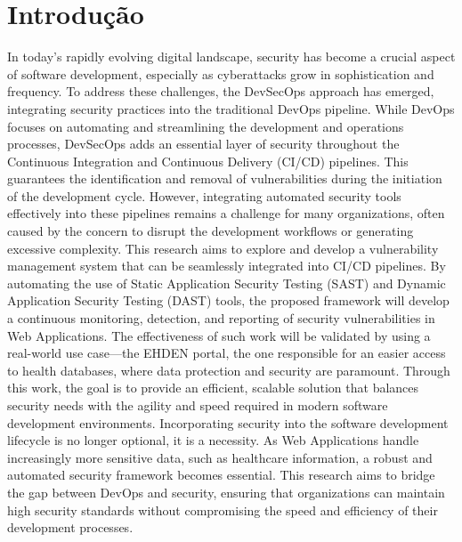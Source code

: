 \chapter{Introdução}%
\label{chapter:introduction}


\begin{introduction}
\end{introduction}

In today’s rapidly evolving digital landscape, security has become a crucial aspect of software development, especially as cyberattacks grow in sophistication and frequency. To address these challenges, the DevSecOps approach has emerged, integrating security practices into the traditional DevOps pipeline. While DevOps focuses on automating and streamlining the development and operations processes, DevSecOps adds an essential layer of security throughout the Continuous Integration and Continuous Delivery (CI/CD) pipelines. This guarantees the identification and removal of vulnerabilities during the initiation of the development cycle. However, integrating automated security tools effectively into these pipelines remains a challenge for many organizations, often caused by the concern to disrupt the development workflows or generating excessive complexity.
This research aims to explore and develop a vulnerability management system that can be seamlessly integrated into CI/CD pipelines. By automating the use of Static Application Security Testing (SAST) and Dynamic Application Security Testing (DAST) tools, the proposed framework will develop a continuous monitoring, detection, and reporting of security vulnerabilities in Web Applications. The effectiveness of such work will be validated by using a real-world use case—the EHDEN portal, the one responsible for an easier access to health databases, where data protection and security are paramount. Through this work, the goal is to provide an efficient, scalable solution that balances security needs with the agility and speed required in modern software development environments.
Incorporating security into the software development lifecycle is no longer optional, it is a necessity. As Web Applications handle increasingly more sensitive data, such as healthcare information, a robust and automated security framework becomes essential. This research aims to bridge the gap between DevOps and security, ensuring that organizations can maintain high security standards without compromising the speed and efficiency of their development processes.




